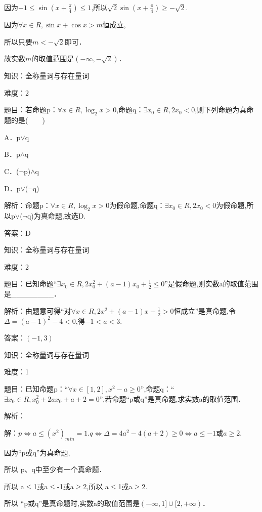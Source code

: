 \documentclass{article} %
\begin{document}
因为$-1\le\sin(x+\frac{\pi}{4})\le 1$,所以$\sqrt{2}\sin(x+\frac{\pi}{4})\ge-\sqrt{2}$.

因为${\forall }x{\in}R,\sin x+\cos x>m$恒成立,

所以只要$m<-\sqrt{2}$即可．

故实数$m$的取值范围是$(-{\infty},-\sqrt{2})$．



知识：全称量词与存在量词

难度：2

题目：若命题p：${\forall }x{\in}R,\log_{2}x{>}0$,命题q：${\exists }x_{0}{\in}R,2x_{0}{<}0$,则下列命题为真命题的是(　　)

A．p${\vee}$q   

B．p${\wedge}$q

C．($\neg$p)${\wedge}$q   

D．p${\vee}$($\neg$q)

解析：命题p：${\forall }x{\in}R,\log_{2}x{>}0$为假命题,命题q：${\exists }x_{0}{\in}R,2x_{0}{<}0$为假命题,所以p${\vee}$($\neg$q)为真命题,故选D.

答案：D



知识：全称量词与存在量词

难度：2

题目：已知命题``${\exists } x_{0}{\in}R,2x_0^2+(a-1)x_{0}+\frac{1}{2}{\le}0$''是假命题,则实数a的取值范围是\_\_\_\_\_\_\_\_．

解析：由题意可得``对${\forall }x{\in}R,2x^{2}+(a-1)x+\frac{1}{2}>0$恒成立''是真命题,令$\Delta=(a-1)^{2}-4<0$,得$-1<a<3$.

答案：$(-1,3)$



知识：全称量词与存在量词

难度：1

题目：已知命题p：``${\forall }x{\in}[1,2],x^{2}-a{\ge}0$'',命题q：``${\exists }x_{0}{\in}R,x_0^2+2ax_{0}+a+2=0$'',若命题``p或q''是真命题,求实数a的取值范围．

解析：

解：$p{\Leftrightarrow }a{\le}(x^{2})_{min}=1$.$q{\Leftrightarrow }\Delta=4a^{2}-4(a+2){\ge}0{\Leftrightarrow }a{\le}-1或a{\ge}2$.

因为``p或q''为真命题,

所以 p、q中至少有一个真命题．

所以 a${\le}$1或a${\le}$-1或a${\ge}$2,所以 a${\le}$1或a${\ge}$2.

所以 ``p或q''是真命题时,实数a的取值范围是$(-{\infty},1]{\cup}[2,+{\infty})$．
\end{document}
